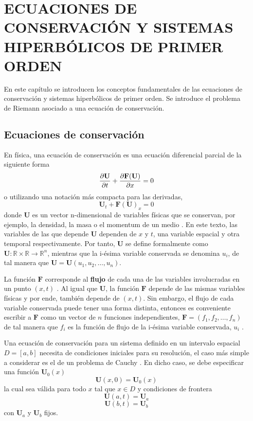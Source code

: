 \chapter{ECUACIONES DE CONSERVACIÓN Y SISTEMAS HIPERBÓLICOS DE PRIMER ORDEN}
En este capítulo se introducen los conceptos fundamentales de las ecuaciones de conservación y sistemas hiperbólicos de primer orden. Se introduce el problema de Riemann asociado a una ecuación de conservación.
\section{Ecuaciones de conservación}
En física, una ecuación de conservación es una ecuación diferencial parcial de la siguiente forma
\begin{equation}
	\pdv{\mathbf{U}}{t} + \pdv{\mathbf{F}(\mathbf{U})}{x} = 0
	\label{eq:conservacion}
\end{equation}
o utilizando una notación más compacta para las derivadas,
\begin{equation}
	\mathbf{U}_{t} + \mathbf{F}(\mathbf{U})_{x} = 0
	\label{eq:conserv-deriv-short}
\end{equation}
donde $\mathbf{U}$ es un vector n-dimensional de variables físicas que se conservan, por ejemplo, la densidad, la masa o el momentum de un medio \cite{Leveque}. En este texto, las variables de las que depende $\mathbf{U}$ dependen de $x$ y $t$, una variable espacial y otra temporal respectivamente. Por tanto, $\mathbf{U}$ se define formalmente como $\mathbf{U} : \mathbb{R} \times  \mathbb{R} \rightarrow \mathbb{R}^{n}$, mientras que la i-ésima variable conservada se denomina $u_{i}$, de tal manera que $\mathbf{U} = \mathbf{U}(u_{1}, u_{2}, \dots, u_{n})$\hspace{2mm}\cite{Leveque}. 

La función $\mathbf{F}$ corresponde al \textbf{flujo} de cada una de las variables involucradas en un punto $(x,t)$ \cite{Leveque}. Al igual que $\mathbf{U}$, la función $\mathbf{F}$ depende de las mismas variables físicas y por ende, también depende de $(x,t)$. Sin embargo, el flujo de cada variable conservada puede tener una forma distinta, entonces es conveniente escribir a $\mathbf{F}$ como un vector de $n$ funciones independientes, $\mathbf{F} = (f_{1}, f_{2}, \dots, f_{n})$
de tal manera que $f_i$ es la función de flujo de la i-ésima variable conservada, $u_i$ \cite{Leveque}.

Una ecuación de conservación para un sistema definido en un intervalo espacial $D = [a,b]$ necesita de condiciones iniciales para su resolución, el caso más simple a considerar es el de un problema de Cauchy \cite{Leveque}. En dicho caso, se debe especificar una función $\mathbf{U}_0(x)$
\begin{equation}
	\mathbf{U}(x,0) = \mathbf{U}_0(x)
\end{equation} 
la cual sea válida para todo $x$ tal que $x \in D$ y condiciones de frontera
\begin{equation}
	\mathbf{U}(a,t) = \mathbf{U}_{a}
\end{equation}
\begin{equation}
	\mathbf{U}(b,t) = \mathbf{U}_{b}
\end{equation}
con $\mathbf{U}_{a}$ y $\mathbf{U}_{b}$ fijos.

